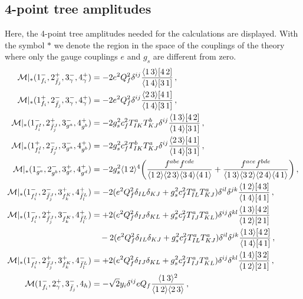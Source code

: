 \subsection{4-point tree amplitudes}
Here, the 4-point tree amplitudes needed for the calculations are displayed.
With the symbol $*$ we denote the region in the space of the couplings of the theory where only the gauge couplings $e$ and $g_s$ are different from zero.
%
\begin{align}
     \mathcal M|_*(1^-_{f_i},2^+_{\bar f_j},3^-_\gamma,4^+_\gamma) &= -2e^2Q_f^2\delta^{ij}\frac{\agl{1}{3}\sqr{4}{2}}{\agl{1}{4}\sqr{3}{1}}\,, \\
    \mathcal M|_*(1^+_{f_i},2^-_{\bar f_j},3^-_\gamma,4^+_\gamma) &= -2e^2Q_f^2\delta^{ij}\frac{\agl{2}{3}\sqr{4}{1}}{\agl{1}{4}\sqr{3}{1}}\,, \\
    \mathcal M|_*(1^-_{f_i^I},2^+_{\bar f_j^J},3^-_{g^a},4^+_{g^b}) &= -2g_s^2c_f^2T^a_{IK}T^b_{KJ}\delta^{ij}\frac{\agl{1}{3}\sqr{4}{2}}{\agl{1}{4}\sqr{3}{1}}\,, \\
    \mathcal M|_*(1^+_{f_i^I},2^-_{\bar f_j^J},3^-_{g^a},4^+_{g^b}) &= -2g_s^2c_f^2T^b_{IK}T^a_{KJ}\delta^{ij}\frac{\agl{2}{3}\sqr{4}{1}}{\agl{1}{4}\sqr{3}{1}}\,, \\
    \mathcal M|_*(1^-_{g^a},2^-_{g^b},3^+_{g^c},4^+_{g^d}) &= -2g_s^2\agl{1}{2}^4\bigg(\frac{f^{abe}f^{cde}}{\agl{1}{2}\agl{2}{3}\agl{3}{4}\agl{4}{1}}+\frac{f^{ace}f^{bde}}{\agl{1}{3}\agl{3}{2}\agl{2}{4}\agl{4}{1}}\bigg)\,,\\
    \mathcal M|_*(1^-_{f_i^I},2^-_{\bar f_j^J},3^+_{f_k^K},4^+_{\bar f_l^L}) &= -2 (e^2 Q_f^2 \delta_{IL}\delta_{KJ}+g_s^2c_f^2T^a_{IL}T^a_{KJ}) \delta^{il}\delta^{jk} \frac{\agl{1}{2}\sqr{4}{3}}{\agl{1}{4}\sqr{4}{1}}\,, \\
    \mathcal M|_*(1^-_{f_i^I},2^+_{\bar f_j^J},3^-_{f_k^K},4^+_{\bar f_l^L}) &= +2(e^2Q_f^2\delta_{IJ}\delta_{KL}+g_s^2c_f^2T^a_{IJ}T^a_{KL})\delta^{ij}\delta^{kl} \frac{\agl{1}{3}\sqr{4}{2}}{\agl{1}{2}\sqr{2}{1}}\nonumber \\
    &\quad - 2(e^2Q_f^2\delta_{IL}\delta_{KJ}+g_s^2c_f^2T^a_{IL}T^a_{KJ}) \delta^{il}\delta^{jk} \frac{\agl{1}{3}\sqr{4}{2}}{\agl{1}{4}\sqr{4}{1}}\,, \\
    \mathcal M|_*(1^-_{f_i^I},2^+_{\bar f_j^J},3^+_{f_k^K},4^-_{\bar f_l^L}) &= +2(e^2Q_f^2\delta_{IJ}\delta_{KL}+g_s^2c_f^2T^a_{IJ}T^a_{KL})\delta^{ij}\delta^{kl} \frac{\agl{1}{4}\sqr{3}{2}}{\agl{1}{2}\sqr{2}{1}}\,,\\
    \mathcal M(1^-_{f_i},2^+_\gamma,3^-_{\bar f_j},4_h) &= -\sqrt{2} y_i \delta^{ij} e Q_f \frac{\agl{1}{3}^2}{\agl{1}{2}\agl{2}{3}}\,, \\

\end{align}
